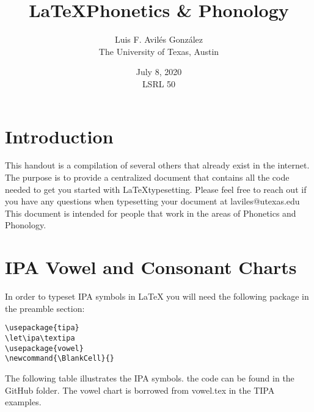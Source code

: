 \documentclass{article}
\title{\LaTeX \space Phonetics \& Phonology}
\author{Luis F. Avil\'es Gonz\'alez\\The University of Texas, Austin}
\date{July 8, 2020\\LSRL 50}
\let\ipa\textipa
\newcommand{\BlankCell}{}
\begin{document}
\maketitle

\section{Introduction}
This handout is a compilation of several others that already exist in the internet. The purpose is to provide a centralized document that contains all the code needed to get you started with \LaTeX\space typesetting. Please feel free to reach out if you have any questions when typesetting your document at laviles@utexas.edu
This document is intended for people that work in the areas of Phonetics and Phonology. 
\section{IPA Vowel and Consonant Charts}
In order to typeset IPA symbols in LaTeX you will need the following package in the preamble section:
\begin{verbatim}
\usepackage{tipa}
\let\ipa\textipa
\usepackage{vowel}
\newcommand{\BlankCell}{}
\end{verbatim}

The following table illustrates the IPA symbols. the code can be found in the GitHub folder. The vowel chart is borrowed from vowel.tex in the TIPA examples.
\end{document}
